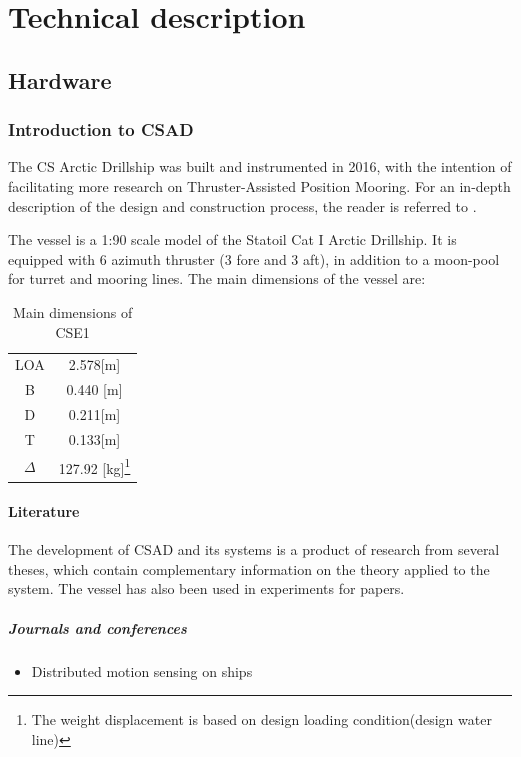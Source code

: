 \part{Technical description}
\chapter{Hardware}
\section{Introduction to CSAD}
The CS Arctic Drillship was built and instrumented in 2016, with the intention of facilitating more research on Thruster-Assisted Position Mooring. For an in-depth description of the design and construction process, the reader is referred to \cite{bjorno2016thruster}. 

The vessel is a 1:90 scale model of the Statoil Cat I Arctic Drillship. It is equipped with 6 azimuth thruster (3 fore and 3 aft), in addition to a moon-pool for turret and mooring lines. The main dimensions of the vessel are:
\begin{table}[h!]
	\caption{Main dimensions of CSE1}
	\centering
	\begin{tabular}{cc}
		\hline
		LOA & 2.578[m]\\
		B & 0.440 [m]\\
		D & 0.211[m]\\
		T & 0.133[m]\\
		$\Delta$ & 127.92 [kg]\footnote{The weight displacement is based on design loading condition(design water line)}\\\hline
	\end{tabular}
\end{table}

\subsection{Literature}
The development of CSAD and its systems is a product of research from several theses, which contain complementary information on the theory applied to the system. The vessel has also been used in experiments for papers. 
\subsubsection{Journals and conferences}
\begin{itemize}
	\item Distributed motion sensing on ships \citep{heyn2017}
\end{itemize}
